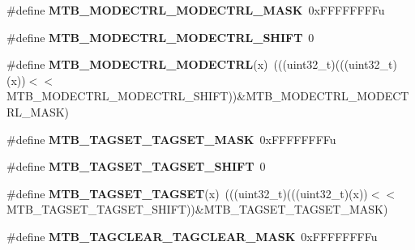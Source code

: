 \begin{DoxyCompactItemize}
\item 
\mbox{\label{group___m_t_b___register___masks_ga1d66deff1d032af57ab9b808a240fa3a}} 
\#define {\bfseries M\+T\+B\+\_\+\+M\+O\+D\+E\+C\+T\+R\+L\+\_\+\+M\+O\+D\+E\+C\+T\+R\+L\+\_\+\+M\+A\+SK}~0x\+F\+F\+F\+F\+F\+F\+F\+Fu
\item 
\mbox{\label{group___m_t_b___register___masks_gaa771d72e2a22b472cb0f5daceeef22bb}} 
\#define {\bfseries M\+T\+B\+\_\+\+M\+O\+D\+E\+C\+T\+R\+L\+\_\+\+M\+O\+D\+E\+C\+T\+R\+L\+\_\+\+S\+H\+I\+FT}~0
\item 
\mbox{\label{group___m_t_b___register___masks_gaff04cf5dbefa8e6e2c809c425d21c150}} 
\#define {\bfseries M\+T\+B\+\_\+\+M\+O\+D\+E\+C\+T\+R\+L\+\_\+\+M\+O\+D\+E\+C\+T\+RL}(x)~(((uint32\+\_\+t)(((uint32\+\_\+t)(x))$<$$<$M\+T\+B\+\_\+\+M\+O\+D\+E\+C\+T\+R\+L\+\_\+\+M\+O\+D\+E\+C\+T\+R\+L\+\_\+\+S\+H\+I\+FT))\&M\+T\+B\+\_\+\+M\+O\+D\+E\+C\+T\+R\+L\+\_\+\+M\+O\+D\+E\+C\+T\+R\+L\+\_\+\+M\+A\+SK)
\item 
\mbox{\label{group___m_t_b___register___masks_gae10888ce190a167551d534dac7019f9d}} 
\#define {\bfseries M\+T\+B\+\_\+\+T\+A\+G\+S\+E\+T\+\_\+\+T\+A\+G\+S\+E\+T\+\_\+\+M\+A\+SK}~0x\+F\+F\+F\+F\+F\+F\+F\+Fu
\item 
\mbox{\label{group___m_t_b___register___masks_gac7d7e704f5b16991586fea0dc061bc3d}} 
\#define {\bfseries M\+T\+B\+\_\+\+T\+A\+G\+S\+E\+T\+\_\+\+T\+A\+G\+S\+E\+T\+\_\+\+S\+H\+I\+FT}~0
\item 
\mbox{\label{group___m_t_b___register___masks_ga2988aa0fa7c14b545fe30a05dcc10c67}} 
\#define {\bfseries M\+T\+B\+\_\+\+T\+A\+G\+S\+E\+T\+\_\+\+T\+A\+G\+S\+ET}(x)~(((uint32\+\_\+t)(((uint32\+\_\+t)(x))$<$$<$M\+T\+B\+\_\+\+T\+A\+G\+S\+E\+T\+\_\+\+T\+A\+G\+S\+E\+T\+\_\+\+S\+H\+I\+FT))\&M\+T\+B\+\_\+\+T\+A\+G\+S\+E\+T\+\_\+\+T\+A\+G\+S\+E\+T\+\_\+\+M\+A\+SK)
\item 
\mbox{\label{group___m_t_b___register___masks_ga50dabf07ab4f88615242b68c0466aab0}} 
\#define {\bfseries M\+T\+B\+\_\+\+T\+A\+G\+C\+L\+E\+A\+R\+\_\+\+T\+A\+G\+C\+L\+E\+A\+R\+\_\+\+M\+A\+SK}~0x\+F\+F\+F\+F\+F\+F\+F\+Fu

\end{DoxyCompactItemize}
